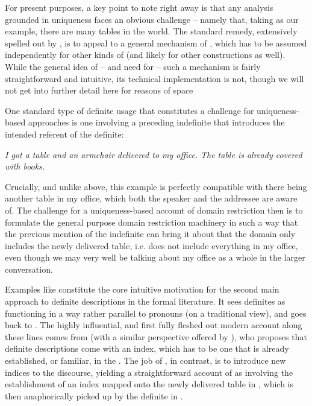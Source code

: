 \documentclass[output=paper
,modfonts
,nonflat]{langscibook}
\begin{document}
For present purposes, a key point to note right away is
that any analysis grounded in uniqueness faces an obvious challenge --
namely that, taking  as our example, there are many tables
in the world. The standard remedy, extensively spelled
out by \citet{Neale1990}, is to appeal to a general mechanism of
, which has to be assumed independently for other kinds of
 (and likely for other constructions as well). While the
general idea of -- and need for -- such a mechanism is fairly
straightforward and intuitive,
its technical implementation is not, though we will not get into
further detail here for reasons of space \citep[for influential
proposals, see, e.g.][]{Westerstahl1984,Fintel1994,StanleySzabo2000,Elbourne2013}

One standard type of definite usage that constitutes a challenge for
uniqueness-based approaches is one involving a preceding indefinite
that introduces the intended referent of the definite:

\begin{exe}
\ex \label{ex:schwarz:2} 
\begin{xlist}
\ex\label{ex:schwarz:2a}
	\textit{I got {a table} and an armchair delivered to my office.}
\ex\label{ex:schwarz:2b}
	\textit{{The table} is already covered with books.} 
\end{xlist}
\end{exe}

Crucially, and unlike  above, this example is perfectly
compatible with there being another table in my office, which both the
speaker and the addressee are aware of. The challenge for a
uniqueness-based account of domain restriction then is to formulate the
general purpose domain restriction machinery in such a way that the
previous mention of the indefinite can bring it about that the domain
only includes the newly delivered table, i.e. does not include
everything in my office, even though we may very well be talking about
my office as a whole in the larger conversation.

Examples like  constitute the core intuitive
motivation for the second main approach to definite descriptions in
the formal literature. It sees definites as functioning in a way
rather parallel to pronouns (on a traditional view), and goes back to \citet{Christophersen1939}. The highly influential,
and first fully fleshed out modern account along these lines comes
from \citet{Heim1982} (with a similar perspective offered by
\citealt{Kamp1981}), who proposes that definite descriptions come with
an index, which has to be one that is already established, or familiar, in the
. The job of , in contrast, is to introduce new
indices to the discourse, yielding a straightforward account of
 as involving the establishment of an index mapped onto
the newly delivered table in , which is then
anaphorically picked up by the definite in . 
\end{document}
